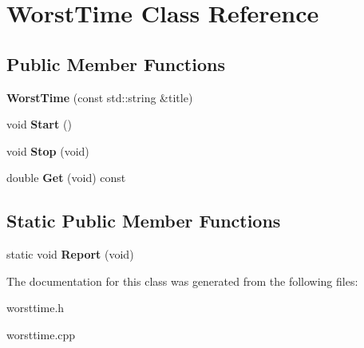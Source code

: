 \hypertarget{classWorstTime}{\section{\-Worst\-Time \-Class \-Reference}
\label{classWorstTime}
}
\subsection*{\-Public \-Member \-Functions}
\begin{DoxyCompactItemize}
\item 
\hypertarget{classWorstTime_a9b1166c0c890e668c65d186452219d45}{{\bfseries \-Worst\-Time} (const std\-::string \&title)}\label{classWorstTime_a9b1166c0c890e668c65d186452219d45}

\item 
\hypertarget{classWorstTime_a5f2c483f9a772f29bb1c57812f2fa398}{void {\bfseries \-Start} ()}\label{classWorstTime_a5f2c483f9a772f29bb1c57812f2fa398}

\item 
\hypertarget{classWorstTime_aaa5040c2cc64fe63c3ebfeb30a3ccde1}{void {\bfseries \-Stop} (void)}\label{classWorstTime_aaa5040c2cc64fe63c3ebfeb30a3ccde1}

\item 
\hypertarget{classWorstTime_ad9ae96ae08569b41ea153e330f7eb5a7}{double {\bfseries \-Get} (void) const }\label{classWorstTime_ad9ae96ae08569b41ea153e330f7eb5a7}

\end{DoxyCompactItemize}
\subsection*{\-Static \-Public \-Member \-Functions}
\begin{DoxyCompactItemize}
\item 
\hypertarget{classWorstTime_a47bf3316c1c5fe16fef899c8cfa17c64}{static void {\bfseries \-Report} (void)}\label{classWorstTime_a47bf3316c1c5fe16fef899c8cfa17c64}

\end{DoxyCompactItemize}


\-The documentation for this class was generated from the following files\-:\begin{DoxyCompactItemize}
\item 
worsttime.\-h\item 
worsttime.\-cpp\end{DoxyCompactItemize}
